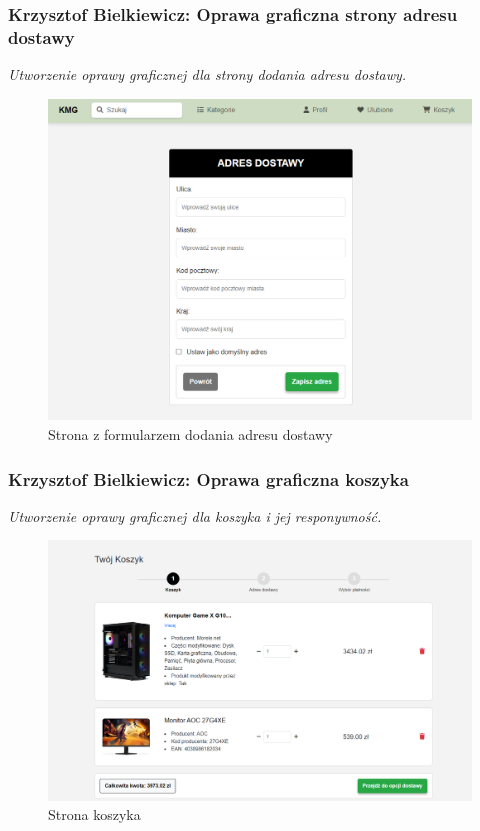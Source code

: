 \documentclass[12pt,a4paper,oneside]{article}
\theoremstyle{definition}
\numberwithin{equation}{section}
\begin{document}
\subsubsection{Krzysztof Bielkiewicz: Oprawa graficzna strony adresu dostawy}
\label{1.3.7}
\textit{Utworzenie oprawy graficznej dla strony dodania adresu dostawy.}
\begin{figure}[H]
    \centering
    \includegraphics[width=0.8\columnwidth]{images/krzysztofBImages/strona-dodaj-adres.png}
    \caption{Strona z formularzem dodania adresu dostawy}
    \label{dodaj-adres}
\end{figure}

\subsubsection{Krzysztof Bielkiewicz: Oprawa graficzna koszyka}
\label{1.3.8}
\textit{Utworzenie oprawy graficznej dla koszyka i jej responywność.}
\begin{figure}[H]
    \centering
    \includegraphics[width=0.8\columnwidth]{images/krzysztofBImages/cart/cart-step1.png}
    \caption{Strona koszyka}
    \label{cart-step1}
\end{figure}
\end{document}
